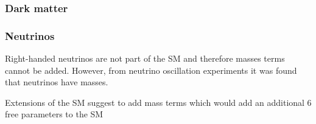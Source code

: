 \subsubsection{Dark matter}

\subsubsection{Neutrinos}
Right-handed neutrinos are not part of the SM and therefore masses terms cannot be added. However, from neutrino oscillation experiments it was found that neutrinos have masses.

Extensions of the SM suggest to add mass terms which would add an additional 6 free parameters to the SM




